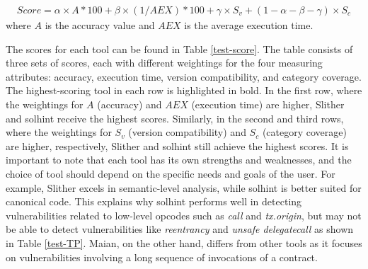 \documentclass[manuscript,screen]{acmart}
\begin{document}
\begin{align*}
  Score = \alpha \times A *100  + \beta \times (1/AEX)*100 + \gamma \times S_v + (1- \alpha - \beta - \gamma) \times S_c
\end{align*}
where  $A$ is the accuracy value and $AEX$ is the average execution time.

The scores for each tool can be found in Table \ref{test-score}. The table consists of three sets of scores, each with different weightings for the four measuring attributes: accuracy, execution time, version compatibility, and category coverage. The highest-scoring tool in each row is highlighted in bold. 
In the first row, where the weightings for $A$ (accuracy) and $AEX$ (execution time) are higher, Slither and solhint receive the highest scores. Similarly, in the second and third rows, where the weightings for $S_v$ (version compatibility) and $S_c$ (category coverage) are higher, respectively, Slither and solhint still achieve the highest scores. 
It is important to note that each tool has its own strengths and weaknesses, and the choice of tool should depend on the specific needs and goals of the user. For example, Slither excels in semantic-level analysis, while solhint is better suited for canonical code. This explains why solhint performs well in detecting vulnerabilities related to low-level opcodes such as \textit{call} and \textit{tx.origin}, but may not be able to detect vulnerabilities like \textit{reentrancy} and \textit{unsafe delegatecall} as shown in Table \ref{test-TP}. Maian, on the other hand, differs from other tools as it focuses on vulnerabilities involving a long sequence of invocations of a contract. 
\end{document}

